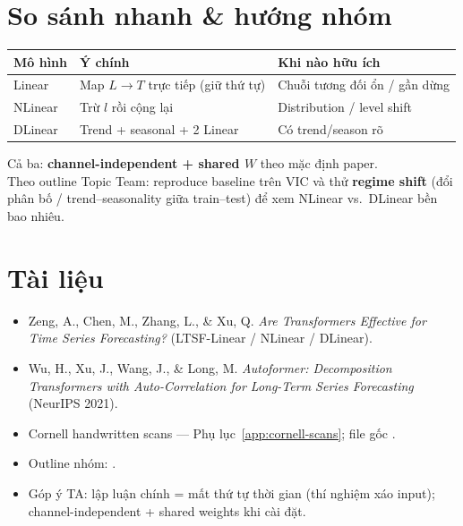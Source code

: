\documentclass[12pt,a4paper]{article}
\begin{document}
\section{So sánh nhanh \& hướng nhóm}

\begin{center}
  \begin{tabular}{@{}llp{}@{}}
    \toprule
    \textbf{Mô hình} & \textbf{Ý chính}                      & \textbf{Khi nào hữu ích}      \\
    \midrule
    Linear           & Map \(L\to T\) trực tiếp (giữ thứ tự) & Chuỗi tương đối ổn / gần dừng \\
    NLinear          & Trừ \(l\) rồi cộng lại                & Distribution / level shift    \\
    DLinear          & Trend + seasonal + 2 Linear           & Có trend/season rõ            \\
    \bottomrule
  \end{tabular}
\end{center}

\vspace{0.5em}
\noindent Cả ba: \textbf{channel-independent + shared \(W\)} theo mặc định paper.\\[0.35em]
\noindent Theo outline Topic Team: reproduce baseline trên VIC và thử \textbf{regime shift}
(đổi phân bố / trend--seasonality giữa train--test) để xem NLinear vs.\ DLinear bền bao nhiêu.

\section*{Tài liệu}
\begin{itemize}
  \item Zeng, A., Chen, M., Zhang, L., \& Xu, Q.
        \textit{Are Transformers Effective for Time Series Forecasting?}
        (LTSF-Linear / NLinear / DLinear).
  \item Wu, H., Xu, J., Wang, J., \& Long, M.
        \textit{Autoformer: Decomposition Transformers with Auto-Correlation
          for Long-Term Series Forecasting} (NeurIPS 2021).
  \item Cornell handwritten scans --- Phụ lục~\ref{app:cornell-scans}; file gốc .
  \item Outline nhóm: .
  \item Góp ý TA: lập luận chính = mất thứ tự thời gian (thí nghiệm xáo input);
        channel-independent + shared weights khi cài đặt.
\end{itemize}
\end{document}
